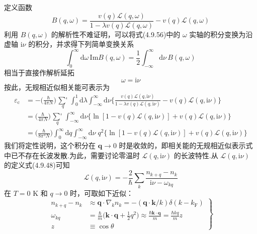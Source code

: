 定义函数
\begin{equation}
  B(q,\omega)=\frac{v(q)\mathcal{L}(q,\omega)}
  {1-\lambda v(q)\mathcal{L}(q,\omega)}
  -v(q)\mathcal{L}(q,\omega)
\end{equation}
利用 $B(q,\omega)$ 的解析性不难证明，可以将式(4.9.56)中的 $\omega$ 实轴的积分变换为沿虚轴 $\mathrm{i}\nu$ 的积分，并求得下列简单变换关系
\begin{equation}
  \int_{0}^{\infty}\mathrm{d}\omega\,\mathrm{Im}B(q,\omega)
  =\frac{1}{2}\int_{-\infty}^{\infty}\mathrm{d}\nu\,B(q,\omega)
\end{equation}
相当于直接作解析延拓
\begin{equation}
  \omega=\mathrm{i}\nu
\end{equation}
按此，无规相近似相关能可表示为
\begin{equation}
\begin{aligned}
  \varepsilon_{\mathrm{c}}
  &=-\bigg(\frac{\hbar}{4\pi N}\bigg)\mathop{{\sum}'}\limits_{q}
  \int_{0}^{1}\mathrm{d}\lambda\int_{-\infty}^{\infty}\mathrm{d}\nu
  \bigg\{\frac{v(q)\mathcal{L}(q,\mathrm{i}\nu)}
  {1-\lambda v(q)\mathcal{L}(q,\mathrm{i}\nu)}
  -v(q)\mathcal{L}(q,\mathrm{i}\nu)\bigg\}\\
  &=\bigg(\frac{\hbar}{4\pi N}\bigg)\mathop{{\sum}'}\limits_{q}
  \int_{-\infty}^{\infty}\mathrm{d}\nu
  \big\{\ln\left[1-v(q)\mathcal{L}(q,\mathrm{i}\nu)\right]
  +v(q)\mathcal{L}(q,\mathrm{i}\nu)\big\}\\
  &=\bigg(\frac{\hbar}{8\pi^{3}N}\bigg)\int_{0}^{\infty}\mathrm{d}q
  \int_{-\infty}^{\infty}\mathrm{d}\nu\;q^{2}
  \big\{\ln\left[1-v(q)\mathcal{L}(q,\mathrm{i}\nu)\right]
  +v(q)\mathcal{L}(q,\mathrm{i}\nu)\big\}
\end{aligned}
\end{equation}
我们将定性说明，这个积分在 $\boldsymbol{q}\to 0$ 时是收敛的，即相关能的无规相近似表示式中已不存在长波发散.为此，需要讨论零温时 $\mathcal{L}(q,\mathrm{i}\nu)$ 的长波特性.从 $\mathcal{L}(q,\mathrm{i}\nu)$ 的定义式(4.9.48)可知
\begin{equation}
  \mathcal{L}(q,\mathrm{i}\nu)=-\frac{2}{\hbar}\sum_{k}
  \frac{n_{k+q}-n_{k}}{\mathrm{i}\nu-\omega_{kq}}
\end{equation}
在 $T=0$ K 和 $q\to 0$ 时，可取如下近似：
\begin{equation}
  \left.\begin{aligned}
  n_{k+q}-n_{k}&\approx\boldsymbol{q}\cdot\nabla_{k}n_{k}
  =-\left(\boldsymbol{q}\cdot\boldsymbol{k}/k\right)\delta\left(k-k_{\mathrm{F}}\right)\\
  \omega_{kq}&=\frac{\hbar}{m}\bigg(\boldsymbol{k}\cdot\boldsymbol{q}
  +\frac{1}{2}q^{2}\bigg)
  \approx\frac{\hbar\boldsymbol{k}\cdot\boldsymbol{q}}{m}
  =\frac{\hbar kq}{m}z\\
  z&\equiv\cos\theta
  \end{aligned}\right\}
\end{equation}
